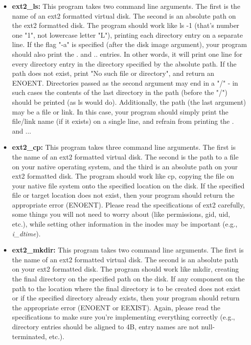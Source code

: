 \documentclass[12pt]{article}
\begin{document}
\begin{itemize}
    \item \textbf{ext2\_ls:} This program takes two command line arguments. The
    first is the name of an ext2 formatted virtual disk. The second is an
    absolute path on the ext2 formatted disk. The program should work like ls -1
    (that's number one "1", not lowercase letter "L"), printing each directory
    entry on a separate line. If the flag "-a" is specified (after the disk
    image argument), your program should also print the . and .. entries. In other
    words, it will print one line for every directory entry in the directory
    specified by the absolute path. If the path does not exist, print "No such
    file or directory", and return an ENOENT. Directories passed as the second
    argument may end in a "/" - in such cases the contents of the last directory
    in the path (before the "/") should be printed (as ls would do). Additionally,
    the path (the last argument) may be a file or link. In this case, your program
    should simply print the file/link name (if it exists) on a single line, and
    refrain from printing the . and ...

    \item \textbf{ext2\_cp:} This program takes three command line arguments. The
    first is the name of an ext2 formatted virtual disk. The second is the path
    to a file on your native operating system, and the third is an absolute path
    on your ext2 formatted disk. The program should work like cp, copying the
    file on your native file system onto the specified location on the disk.
    If the specified file or target location does not exist, then your program
    should return the appropriate error (ENOENT). Please read the specifications
    of ext2 carefully, some things you will not need to worry about (like permissions,
    gid, uid, etc.), while setting other information in the inodes may be important
    (e.g., \textit{i\_dtime}).

    \item \textbf{ext2\_mkdir:} This program takes two command line arguments.
    The first is the name of an ext2 formatted virtual disk. The second is an
    absolute path on your ext2 formatted disk. The program should work like mkdir,
    creating the final directory on the specified path on the disk. If any component
    on the path to the location where the final directory is to be created does
    not exist or if the specified directory already exists, then your program
    should return the appropriate error (ENOENT or EEXIST). Again, please read
    the specifications to make sure you're implementing everything correctly
    (e.g., directory entries should be aligned to 4B, entry names are not
    null-terminated, etc.).


\end{itemize}
\end{document}
